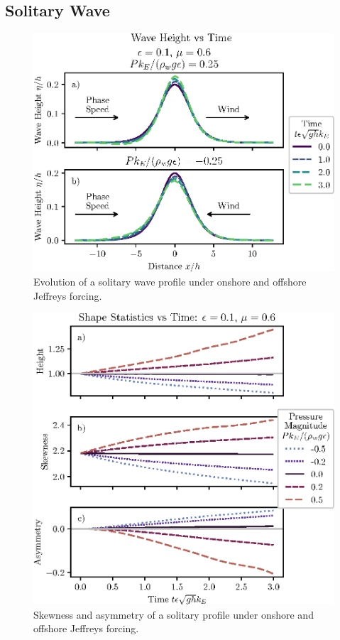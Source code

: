 \documentclass{jfm}
\let\Oldsubsection\subsection
\renewcommand{\subsection}{\FloatBarrier\Oldsubsection}
\begin{document}
\subsection{Solitary Wave}
\begin{figure}
  \centering
  \includegraphics{Snapshots-Positive-Negative.eps}
  \caption{
    Evolution of a solitary wave profile under onshore and offshore Jeffreys
    forcing.
  }
\end{figure}

\begin{figure}
  \centering
  \includegraphics{Skew-Asymm.eps}
  \caption{
    Skewness and asymmetry of a solitary profile under onshore and offshore
    Jeffreys forcing.
  }
\end{figure}
\end{document}
